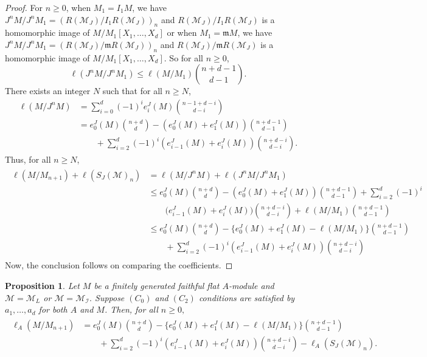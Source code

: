 \documentclass[11pt,reqno]{amsart}
\newtheorem{proposition}[theorem]{Proposition}
\theoremstyle{definition}
\newcommand{\m}{\mathfrak m}
\def\M{{\mathcal M}}
\def\I{{\mathcal I}}
\numberwithin{equation}{section}
\begin{document}
\begin{proof}
	For $n\geq 0$, when $M_1=I_1M$, we have $J^nM/J^n M_1= (R(\M_J)/I_1 R(\M_J))_n$ and $R(\M_J)/I_1 R(\M_J)$ is a homomorphic image of $M/M_1[X_1,\ldots,X_d]$ or when $M_1=\m M$, we have $J^nM/J^n M_1= (R(\M_J)/\m R(\M_J))_n$ and $R(\M_J)/\m R(\M_J)$ is a homomorphic image of $M/M_1[X_1,\ldots,X_d]$. So for all $n\geq 0$, 
	\begin{equation}
		\ell(J^nM/J^{n} M_1)\leq \ell(M/M_1)\binom{n+d-1}{d-1}.\label{equation:step-hilbFunfibercone}
	\end{equation}
	There exists an integer $N$ such that for all $n\geq N$,
	\begin{align*}
		\ell(M/J^nM)&=\mathop\sum\limits_{i=0}^d (-1)^ie_i^J(M)\binom{n-1+d-i}{d-i}\\
		&=e_0^J(M)\binom{n+d}{d}-(e_0^J(M)+e_1^J(M))\binom{n+d-1}{d-1}\\
		&\qquad+\mathop\sum\limits_{i=2}^d(-1)^i(e_{i-1}^J(M)+e_i^J(M))\binom{n+d-i}{d-i}.
	\end{align*}
	Thus, for all $n\geq N$,
	\begin{align*}
		\begin{split}
			\ell(M/M_{n+1})+\ell(S_J(\M)_n)&=\ell(M/J^nM)+\ell(J^nM/J^n M_1)\\
			&\leq e_0^J(M)\binom{n+d}{d}-(e_0^J(M)+e_1^J(M))\binom{n+d-1}{d-1}+\mathop\sum\limits_{i=2}^d(-1)^i\\
			&\qquad\big(e_{i-1}^J(M)+ e_i^J(M)\big)\binom{n+d-i}{d-i}+\ell(M/M_1)\binom{n+d-1}{d-1}\\
			&\leq e_0^J(M)\binom{n+d}{d}-\Big\{ e_0^J(M)+e_1^J(M)-\ell(M/M_1)\Big\}\binom{n+d-1}{d-1}\\
			&\qquad+\mathop\sum\limits_{i=2}^d(-1)^i(e_{i-1}^J(M)+e_i^J(M))\binom{n+d-i}{d-i} 
		\end{split}
	\end{align*}
	Now, the conclusion  follows on comparing the coefficients.
\end{proof}
\begin{proposition}\label{proposition-2.4}    Let $M$ be a finitely generated faithful flat $A$-module and $\M=\M_L$ or $\M=\M_\I.$ Suppose $(C_0)$ and $(C_2)$ conditions are satisfied by $a_1,\ldots,a_d$ for both $A$ and $M$. Then,  for all $n\geq 0,$ 
	\begin{align}\label{newlabel-eq-1}
		\begin{split}
			\ell_A(M/M_{n+1})&= e_0^J(M)\binom{n+d}{d}-\Big\{ e_0^J(M)+e_1^J(M)-\ell(M/M_1)\Big\}\binom{n+d-1}{d-1}\\
			&\qquad+\mathop\sum\limits_{i=2}^d(-1)^i(e_{i-1}^J(M)+e_i^J(M))\binom{n+d-i}{d-i}-\ell_A(S_J(\M)_{n}).
		\end{split}
	\end{align}
\end{proposition}
\end{document}
